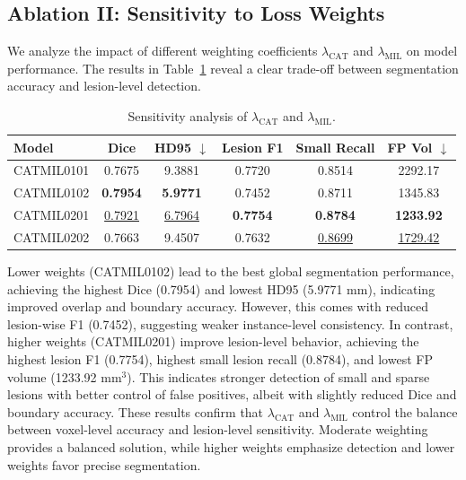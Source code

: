 \subsection*{Ablation II: Sensitivity to Loss Weights}

We analyze the impact of different weighting coefficients
$\lambda_{\text{CAT}}$ and $\lambda_{\text{MIL}}$ on model performance.
The results in Table~\ref{tab:ablation_lambda} reveal a clear trade-off
between segmentation accuracy and lesion-level detection.

\begin{table}[H]
\centering
\caption{Sensitivity analysis of $\lambda_{\text{CAT}}$ and $\lambda_{\text{MIL}}$.}
\label{tab:ablation_lambda}
\begin{tabular}{lccccc}
\hline
Model & Dice & HD95 $\downarrow$ & Lesion F1 & Small Recall & FP Vol $\downarrow$ \\
\hline
CATMIL0101 & 0.7675 & 9.3881 & 0.7720 & 0.8514 & 2292.17 \\
CATMIL0102 & \textbf{0.7954} & \textbf{5.9771} & 0.7452 & 0.8711 & 1345.83 \\
CATMIL0201 & \underline{0.7921} & \underline{6.7964} & \textbf{0.7754} & \textbf{0.8784} & \textbf{1233.92} \\
CATMIL0202 & 0.7663 & 9.4507 & 0.7632 & \underline{0.8699} & \underline{1729.42} \\
\hline
\end{tabular}
\end{table}

Lower weights (CATMIL0102) lead to the best global segmentation
performance, achieving the highest Dice (0.7954) and lowest HD95
(5.9771 mm), indicating improved overlap and boundary accuracy. However,
this comes with reduced lesion-wise F1 (0.7452), suggesting weaker
instance-level consistency. In contrast, higher weights (CATMIL0201) improve lesion-level behavior,
achieving the highest lesion F1 (0.7754), highest small lesion recall
(0.8784), and lowest FP volume (1233.92 mm$^3$). This indicates stronger
detection of small and sparse lesions with better control of false
positives, albeit with slightly reduced Dice and boundary accuracy. These results confirm that $\lambda_{\text{CAT}}$ and
$\lambda_{\text{MIL}}$ control the balance between voxel-level accuracy
and lesion-level sensitivity. Moderate weighting provides a balanced
solution, while higher weights emphasize detection and lower weights
favor precise segmentation.